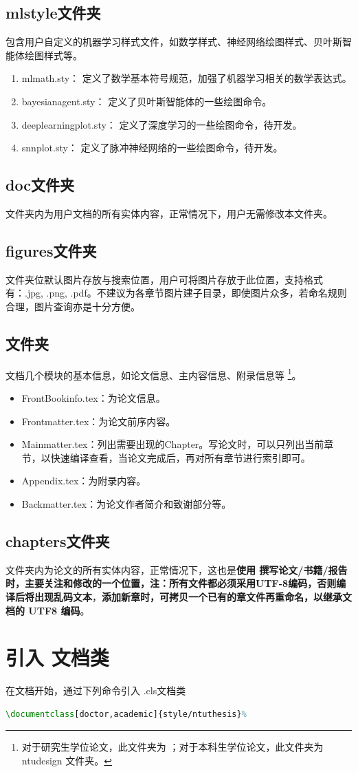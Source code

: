 \subsection{mlstyle文件夹}
包含用户自定义的机器学习样式文件，如数学样式、神经网络绘图样式、贝叶斯智能体绘图样式等。
\begin{enumerate}
    \item mlmath.sty： 定义了数学基本符号规范，加强了机器学习相关的数学表达式。
    \item bayesianagent.sty： 定义了贝叶斯智能体的一些绘图命令。
    \item deeplearningplot.sty： 定义了深度学习的一些绘图命令，待开发。
    \item snnplot.sty： 定义了脉冲神经网络的一些绘图命令，待开发。
\end{enumerate}

\subsection{doc文件夹}
文件夹内为用户文档的所有实体内容，正常情况下，用户无需修改本文件夹。


\subsection{figures文件夹}
文件夹位默认图片存放与搜索位置，用户可将图片存放于此位置，支持格式有：.jpg, .png, .pdf。不建议为各章节图片建子目录，即使图片众多，若命名规则合理，图片查询亦是十分方便。

\subsection{ \projectname 文件夹}
文档几个模块的基本信息，如论文信息、主内容信息、附录信息等 \footnote{对于研究生学位论文，此文件夹为 \projectname；对于本科生学位论文，此文件夹为 ntudesign 文件夹。}。
\begin{itemize}
    \item FrontBookinfo.tex：为论文信息。
    \item Frontmatter.tex：为论文前序内容。
    \item Mainmatter.tex：列出需要出现的Chapter。写论文时，可以只列出当前章节，以快速编译查看，当论文完成后，再对所有章节进行索引即可。
    \item Appendix.tex：为附录内容。
    \item Backmatter.tex：为论文作者简介和致谢部分等。
\end{itemize}

\subsection{chapters文件夹}
文件夹内为论文的所有实体内容，正常情况下，这也是\textbf{使用 \projectname 撰写论文/书籍/报告时，主要关注和修改的一个位置，注：所有文件都必须采用UTF-8编码，否则编译后将出现乱码文本}，\textbf{添加新章时，可拷贝一个已有的章文件再重命名，以继承文档的 UTF8 编码}。

\section{引入 \projectname 文档类}
在文档开始，通过下列命令引入 \projectname.cls文档类
\begin{lstlisting}[language=tex]
    \documentclass[doctor,academic]{style/ntuthesis}%
\end{lstlisting}

